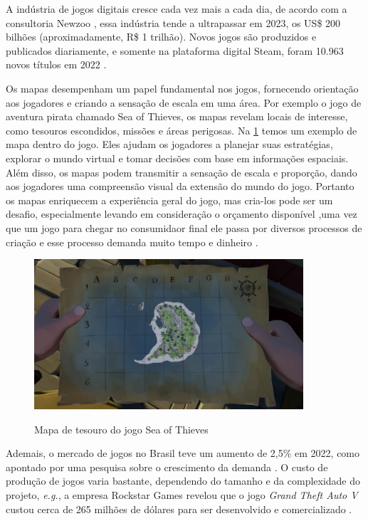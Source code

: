 A indústria de jogos digitais cresce cada vez mais a cada dia, de acordo com a consultoria Newzoo \space\cite{quanto_games_vao_movimentar}, essa indústria tende a ultrapassar em 2023, os US\$ 200 bilhões (aproximadamente, R\$ 1 trilhão). Novos jogos são produzidos e publicados diariamente, e somente na plataforma digital Steam, foram 10.963 novos títulos em 2022\space
\cite{numero_de_jogos_publicados_na_steam}.

Os mapas desempenham um papel fundamental nos jogos, fornecendo orientação aos jogadores e criando a sensação de escala em uma área. Por exemplo o jogo de aventura pirata chamado Sea of Thieves, os mapas revelam locais de interesse, como tesouros escondidos, missões e áreas perigosas. Na \cref{fig:treasureMap} temos um exemplo de mapa dentro do jogo. Eles ajudam os jogadores a planejar suas estratégias, explorar o mundo virtual e tomar decisões com base em informações espaciais. Além disso, os mapas podem transmitir a sensação de escala e proporção, dando aos jogadores uma compreensão visual da extensão do mundo do jogo. Portanto os mapas enriquecem a experiência geral do jogo, mas cria-los pode ser um desafio, especialmente levando em consideração o orçamento disponível ,uma vez que um jogo para chegar no consumidaor final ele passa por diversos processos de criação e esse processo demanda muito tempo e dinheiro \cite{video-game-maps, lecafedugeek}.

\begin{figure}[H]
	\caption{Mapa de tesouro do jogo Sea of Thieves}
	\centering %
	\includegraphics[width=10cm]{figures/Treasure_Map.jpg} %
	\label{fig:treasureMap}
\end{figure}

Ademais, o mercado de jogos no Brasil teve um aumento de 2,5\% em 2022, como apontado por uma pesquisa sobre o crescimento da demanda \space \cite{pesquisa_games_brasil}. O custo de produção de jogos varia bastante, dependendo do tamanho e da complexidade do projeto, \emph{e.g.}, a empresa Rockstar Games revelou que o jogo \textit{Grand Theft Auto V} custou cerca de 265 milhões de dólares para ser desenvolvido e comercializado \space
\cite{gta_quanto_custou}.

